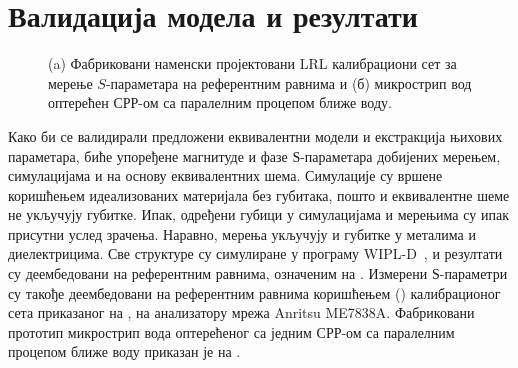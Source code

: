 \section{Валидација модела и резултати}

\begin{figure}[!t]
\centering
{}\hfill
{}
\caption{(a) Фабриковани наменски пројектовани LRL калибрациони сет за мерење $S$-параметара на референтним равнима и (б) микрострип вод оптерећен СРР-ом са паралелним процепом ближе воду.} 
\label{f9}
\end{figure}
Како би се валидирали предложени еквивалентни модели и екстракција њихових параметара, биће упоређене магнитуде и фазе $Ѕ$-параметара добијених мерењем, симулацијама и на основу еквивалентних шема. Симулације су вршене коришћењем идеализованих материјала без губитака, пошто и еквивалентне шеме не укључују губитке. Ипак, одређени губици у симулацијама и мерењима су ипак присутни услед зрачења. Наравно, мерења укључују и губитке у металима и диелектрицима. Све структуре су симулиране у програму WIPL-D~\cite{wipl}, и резултати су деембедовани на референтним равнима, означеним на . Измерени $Ѕ$-параметри су такође деембедовани на референтним равнима коришћењем  () калибрационог сета приказаног на , на анализатору мрежа Anritsu ME7838A. Фабриковани прототип микрострип вода оптерећеног са једним СРР-ом са паралелним процепом ближе воду приказан је на .

